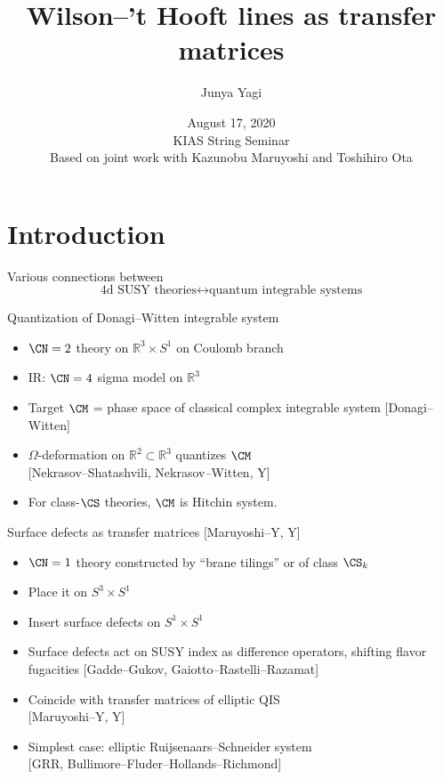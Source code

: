 \documentclass[t]{beamer}
\title{Wilson--'t Hooft lines as transfer matrices}
\date{August 17, 2020 \\
  \medskip
  \small
  KIAS String Seminar \\
  \bigskip
  \scriptsize 
  Based on joint work with Kazunobu Maruyoshi and Toshihiro Ota}
\author{Junya Yagi}
\institute{Perimeter Institute for Theoretical Physics}
\newcommand{\R}{\mathbb{R}}
\renewcommand{\cite}[1]{{\color{brown} \scriptsize [#1]}}
\begin{document}
\begin{frame}
  \titlepage
\end{frame}

\section*{Introduction}

\begin{frame}
  Various connections between
  \begin{equation*}
    \text{4d SUSY theories}
    \longleftrightarrow
    \text{quantum integrable systems}
  \end{equation*}

  Quantization of Donagi--Witten integrable system
  \begin{itemize}
  \item $\CN = 2$ theory on $\R^3 \times S^1$ on Coulomb branch

  \item IR: $\CN = 4$ sigma model on $\R^3$
    
  \item Target $\CM$ = phase space of classical complex integrable
    system \cite{Donagi--Witten}

  \item $\Omega$-deformation on $\R^2 \subset \R^3$ quantizes $\CM$ \\
    \cite{Nekrasov--Shatashvili, Nekrasov--Witten, Y}

  \item For class-$\CS$ theories, $\CM$ is Hitchin system.
  \end{itemize}
\end{frame}

\begin{frame}
  Surface defects as transfer matrices \cite{Maruyoshi--Y, Y}

  \begin{itemize}
  \item $\CN = 1$ theory constructed by ``brane tilings'' or of
    class $\CS_k$
    
  \item Place it on $S^3 \times S^1$
    
  \item Insert surface defects on $S^1 \times S^1$
    
  \item Surface defects act on SUSY index as difference operators,
    shifting flavor fugacities \cite{Gadde--Gukov,
      Gaiotto--Rastelli--Razamat}

  \item Coincide with transfer matrices of elliptic QIS \\
    \cite{Maruyoshi--Y, Y}
    
  \item Simplest case: elliptic Ruijsenaars--Schneider system \\
    \cite{GRR, Bullimore--Fluder--Hollands--Richmond}
  \end{itemize}
\end{frame}
\end{document}
